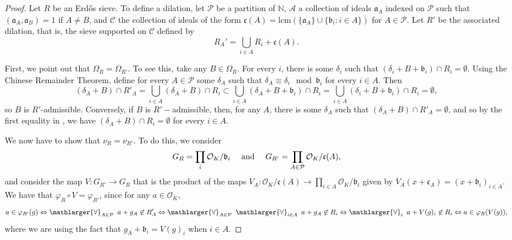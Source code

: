 \documentclass[a4paper,11pt,reqno]{amsart}
\theoremstyle{plain}
\theoremstyle{remark}
\newcommand{\co}{\mathcal{O}}
\newcommand{\ga}{\mathfrak{a}}
\newcommand{\gb}{\mathfrak{b}}
\newcommand{\gc}{\mathfrak{c}}
\newcommand{\gr}{G_{R}}
\begin{document}
			\begin{proof}
				Let $R$ be an Erdős sieve. To define a dilation, let $\mathcal{P}$ be a partition of $\mathbb{N}$, $\mathcal{A}$ a collection of ideals $\ga_A$ indexed on $\mathcal{P}$ such that $(\ga_A,\ga_B) =1$ if $A \neq B$, and $\mathcal{C}$ the collection of ideals of the form $\gc(A) = \text{lcm}(\{\ga_A\}\cup\{\gb_i:i\in A\})$ for $A \in \mathcal{P}$. Let $R'$ be the associated dilation, that is, the sieve supported on $\mathcal{C}$ defined by $$R_A' = \bigcup_{i \in A} R_i + \gc(A).$$
				
				First, we point out that $\Omega_{R} = \Omega_{R'}$. To see this, take any $B \in \Omega_R$. For every $i$, there is some $\delta_i$ such that $(\delta_i + B + \gb_i ) \cap R_i = \emptyset$. Using the Chinese Remainder Theorem, define for every $A \in \mathcal{P}$ some $\delta_A$ such that $\delta_A \equiv \delta_i \mod \gb_i$ for every $i \in A$. Then
				\begin{equation}
					\label{eq: equality with deltas}
					(\delta_A + B) \cap R'_A = \bigcup_{i \in A} \left(\delta_A + B \right) \cap R_i \subset  \bigcup_{i \in A} \left(\delta_A + B + \gb_i \right) \cap R_i =  \bigcup_{i \in A} \left(\delta_i + B + \gb_i\right)  \cap R_i= \emptyset,
				\end{equation} so $B$ is $R'$-admissible. Conversely, if $B$ is $R'-$admissible, then, for any $A$, there is some $\delta_A$ such that $(\delta_A + B) \cap R'_A = \emptyset$, and so by the first equality in , we have $\left(\delta_A + B \right) \cap R_i = \emptyset$ for every $i \in A$.
				
				We now have to show that $\nu_R = \nu_{R'}$. To do this, we consider $$G_R = \prod_i \co_K/\gb_i \hspace{ 10 pt} \text{ and } \hspace{10 pt} G_{R'} = \prod_{A \in \mathcal{P}} \co_K/\gc(A),$$ and consider the map $V: G_{R'}  \rightarrow \gr $ that is the product of the maps $V_A: \co_K/\gc(A)\rightarrow \prod_{i\in A} \co_K/\gb_i$ given by $V_A(x + \gc_A) = (x+ \gb_i)_{i \in A}$. We have that $\varphi_R \circ V  = \varphi_{R'}$, since for any $a \in \co_K$, $$a \in \varphi_{R'}(g) \Leftrightarrow \mathlarger{\forall}_{A \in \mathcal{P}} \hspace{5pt} a+g_A \not \in R'_A 
				\Leftrightarrow \mathlarger{\forall}_{A \in \mathcal{P}} \hspace{5pt} \mathlarger{\forall}_{i \in A} \hspace{5pt} a+g_A \not  \in R_i 
				\Leftrightarrow \mathlarger{\forall}_{i} \hspace{5pt} a+V(g)_i \not  \in R_i
				\Leftrightarrow a \in \varphi_R(V(g)),
				$$ where we are using the fact that $g_A + \gb_i = V(g)_i$ when $i \in A$. 
				

\end{proof}
\end{document}
